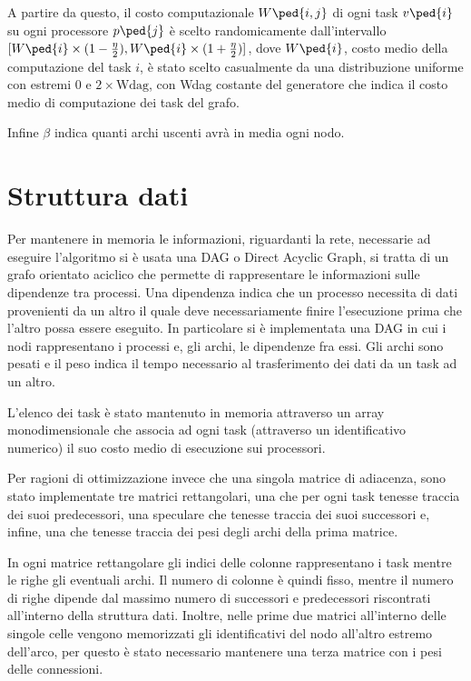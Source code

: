 A partire da questo, il costo computazionale $W\ped{i,j}$ di ogni task $v\ped{i}$ su ogni processore $p\ped{j}$ è scelto randomicamente dall'intervallo $[W\ped{i}\times (1-\frac{\eta}{2}), W\ped{i}\times (1+\frac{\eta}{2})]$, dove $W\ped{i}$, costo medio della computazione del task $i$, è stato scelto casualmente da una distribuzione uniforme con estremi $0$ e $2 \times \text{Wdag}$, con Wdag costante del generatore che indica il costo medio di computazione dei task del grafo.

Infine $\beta$ indica quanti archi uscenti avrà in media ogni nodo.

\section{Struttura dati}
Per mantenere in memoria le informazioni, riguardanti la rete, necessarie ad eseguire l'algoritmo si è usata una DAG o Direct Acyclic Graph, si tratta di un grafo orientato aciclico che permette di rappresentare le informazioni sulle dipendenze tra processi. Una dipendenza indica che un processo necessita di dati provenienti da un altro il quale deve necessariamente finire l'esecuzione prima che l'altro possa essere eseguito.
In particolare si è implementata una DAG in cui i nodi rappresentano i processi e, gli archi, le dipendenze fra essi. Gli archi sono pesati e il peso indica il tempo necessario al trasferimento dei dati da un task ad un altro.

L'elenco dei task è stato mantenuto in memoria attraverso un array monodimensionale che associa ad ogni task (attraverso un identificativo numerico) il suo costo medio di esecuzione sui processori.

Per ragioni di ottimizzazione invece che una singola matrice di adiacenza, sono stato implementate tre matrici rettangolari, una che per ogni task tenesse traccia dei suoi predecessori, una speculare che tenesse traccia dei suoi successori e, infine, una che tenesse traccia dei pesi degli archi della prima matrice.

In ogni matrice rettangolare gli indici delle colonne rappresentano i task mentre le righe gli eventuali archi. Il numero di colonne è quindi fisso, mentre il numero di righe dipende dal massimo numero di successori e predecessori riscontrati all'interno della struttura dati. Inoltre, nelle prime due matrici all'interno delle singole celle vengono memorizzati gli identificativi del nodo all'altro estremo dell'arco, per questo è stato necessario mantenere una terza matrice con i pesi delle connessioni.

